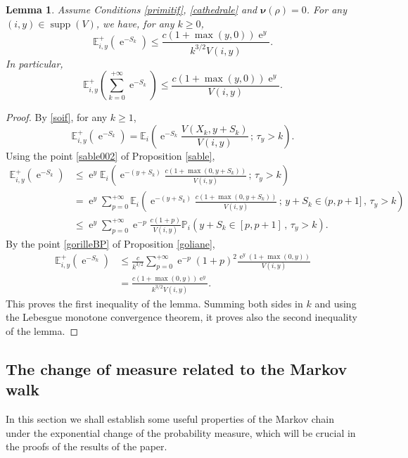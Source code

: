 \documentclass[12pt]{amsart}
\newtheorem{lemma}[theorem]{Lemma}
\theoremstyle{definition}
\numberwithin{equation}{section}
\def\bb#1{\mathbb{#1}}
\def\bs#1{\boldsymbol{#1}}
\def\geq{\geqslant}
\def\leq{\leqslant}
\DeclareMathOperator{\e}{e}
\DeclareMathOperator{\supp}{supp}
\begin{document}
\begin{lemma} \label{soir}
Assume Conditions \ref{primitif}, \ref{cathedrale} and $\bs \nu(\rho) = 0$. 
For any $(i,y) \in \supp(V)$, we have, for any $k \geq 0$,
\[
\bb E_{i,y}^+ \left( \e^{-S_k}\right) \leq \frac{c \left( 1+\max(y,0) \right)\e^{y}}{k^{3/2} V(i,y)}.
\]
In particular,
\[
\bb E_{i,y}^+ \left( \sum_{k=0}^{+\infty} \e^{-S_k} \right) \leq \frac{c \left( 1+\max(y,0) \right)\e^{y}}{V(i,y)}.
\]
\end{lemma}

\begin{proof} By \eqref{soif}, for any $k \geq 1$,
\[
\bb E_{i,y}^+ \left( \e^{-S_k}\right) = \bb E_i \left( \e^{-S_k} \frac{V\left( X_k, y+S_k \right)}{V(i,y)} \,;\, \tau_y > k \right).
\]
Using the point \ref{sable002} of Proposition \ref{sable},
\begin{align*}
	\bb E_{i,y}^+ \left( \e^{-S_k}\right) &\leq \e^{y} \bb E_i \left( \e^{-(y+S_k)} \frac{c\left( 1+\max \left(0,y+S_k \right) \right)}{V(i,y)} \,;\, \tau_y > k \right) \\
	&= \e^{y} \sum_{p=0}^{+\infty} \bb E_i \left( \e^{-(y+S_k)} \frac{c\left( 1+\max \left(0,y+S_k \right) \right)}{V(i,y)} \,;\, y+S_k \in (p,p+1] \,,\, \tau_y > k \right) \\
	&\leq \e^{y} \sum_{p=0}^{+\infty} \e^{-p} \frac{c( 1+p )}{V(i,y)} \bb P_i \left( y+S_k \in [p,p+1] \,,\, \tau_y > k \right).
\end{align*}
By the point \ref{gorilleBP} of Proposition \ref{goliane},
\begin{align*}
	\bb E_{i,y}^+ \left( \e^{-S_k}\right) &\leq \frac{c}{k^{3/2}} \sum_{p=0}^{+\infty} \e^{-p} ( 1+p )^2 \frac{\e^{y}\left( 1+\max(0,y) \right)}{V(i,y)} \\
	&= \frac{c \left( 1+\max(0,y) \right)\e^{y}}{k^{3/2}V(i,y)}.
\end{align*}
This proves the first inequality of the lemma. Summing both sides in $k$ and using the Lebesgue monotone convergence theorem, it proves also the second inequality of the lemma.
\end{proof}


\subsection{The change of measure related to the Markov walk}
\label{nenuphar}


In this section we shall establish some useful properties of the Markov chain under the exponential change of the probability measure, which will be crucial in the proofs of the results of the paper.
\end{document}

